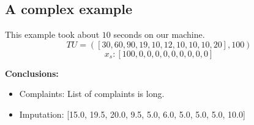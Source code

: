 \documentclass{article}
\begin{document}
\subsection{A complex example}
This example took about $10$ seconds on our machine.
$$TU = ([30, 60, 90, 19, 10, 12, 10, 10, 10, 20], 100)$$
$$\textbf{$x_s$}: [100, 0, 0, 0, 0, 0, 0, 0, 0, 0]$$

\textbf{Conclusions:}
\begin{itemize}
\item Complaints: List of complaints is long.
\item Imputation: [15.0, 19.5, 20.0, 9.5, 5.0, 6.0, 5.0, 5.0, 5.0, 10.0]
\end{itemize}


\end{document}
